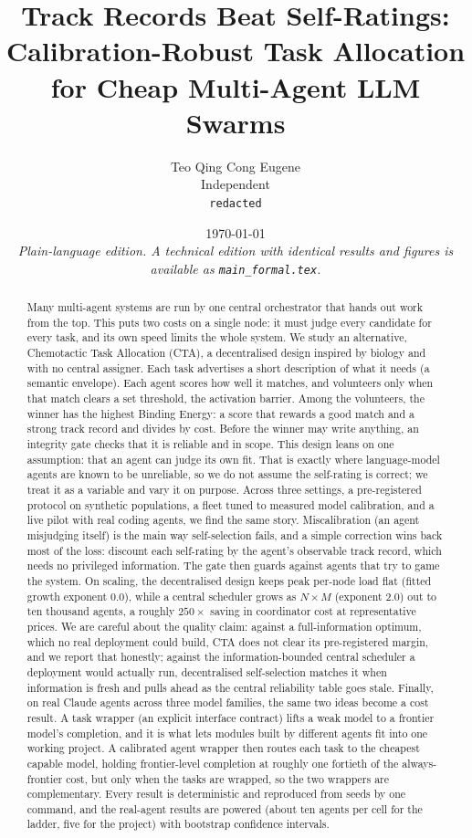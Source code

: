 \documentclass[11pt]{article}
\title{\bfseries Track Records Beat Self-Ratings:\\ Calibration-Robust Task Allocation for Cheap Multi-Agent LLM Swarms}
\author{Teo Qing Cong Eugene\\ \small Independent \\ \small \texttt{redacted}}
\date{\today\\[2pt] \small\itshape Plain-language edition. A technical edition with identical results and figures is available as \texttt{main\_formal.tex}.}
\begin{document}
\maketitle

\begin{abstract}
\noindent
Many multi-agent systems are run by one central orchestrator that hands out work from the top. This puts two costs on a single node: it must judge every candidate for every task, and its own speed limits the whole system. We study an alternative, Chemotactic Task Allocation (CTA), a decentralised design inspired by biology and with no central assigner. Each task advertises a short description of what it needs (a semantic envelope). Each agent scores how well it matches, and volunteers only when that match clears a set threshold, the activation barrier. Among the volunteers, the winner has the highest Binding Energy: a score that rewards a good match and a strong track record and divides by cost. Before the winner may write anything, an integrity gate checks that it is reliable and in scope. This design leans on one assumption: that an agent can judge its own fit. That is exactly where language-model agents are known to be unreliable, so we do not assume the self-rating is correct; we treat it as a variable and vary it on purpose. Across three settings, a pre-registered protocol on synthetic populations, a fleet tuned to measured model calibration, and a live pilot with real coding agents, we find the same story. Miscalibration (an agent misjudging itself) is the main way self-selection fails, and a simple correction wins back most of the loss: discount each self-rating by the agent's observable track record, which needs no privileged information. The gate then guards against agents that try to game the system. On scaling, the decentralised design keeps peak per-node load flat (fitted growth exponent $0.0$), while a central scheduler grows as $N\times M$ (exponent $2.0$) out to ten thousand agents, a roughly $250\times$ saving in coordinator cost at representative prices. We are careful about the quality claim: against a full-information optimum, which no real deployment could build, CTA does not clear its pre-registered margin, and we report that honestly; against the information-bounded central scheduler a deployment would actually run, decentralised self-selection matches it when information is fresh and pulls ahead as the central reliability table goes stale. Finally, on real Claude agents across three model families, the same two ideas become a cost result. A task wrapper (an explicit interface contract) lifts a weak model to a frontier model's completion, and it is what lets modules built by different agents fit into one working project. A calibrated agent wrapper then routes each task to the cheapest capable model, holding frontier-level completion at roughly one fortieth of the always-frontier cost, but only when the tasks are wrapped, so the two wrappers are complementary. Every result is deterministic and reproduced from seeds by one command, and the real-agent results are powered (about ten agents per cell for the ladder, five for the project) with bootstrap confidence intervals.
\end{abstract}
\end{document}
